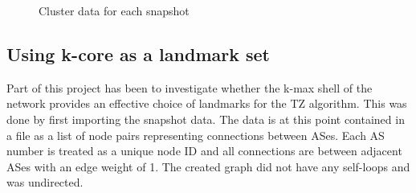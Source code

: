 \documentclass{dissertation/mpaper}
\begin{document}
\begin{figure}
  \centering
  \hfill
  \hfill
  \caption{Cluster data for each snapshot}
\end{figure}

\subsection{Using k-core as a landmark set}
Part of this project has been to investigate whether the k-max shell of the network provides an effective choice of landmarks for the TZ algorithm. This was done by first importing the snapshot data. The data is at this point contained in a file as a list of node pairs representing connections between ASes. Each AS number is treated as a unique node ID and all connections are between adjacent ASes with an edge weight of 1. The created graph did not have any self-loops and was undirected.
\end{document}

